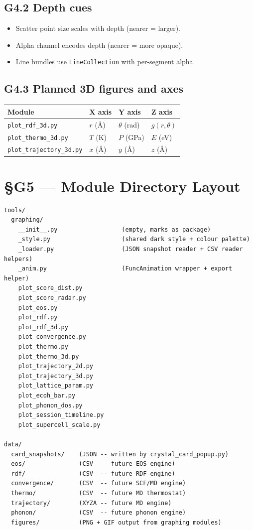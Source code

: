 \documentclass[11pt,a4paper]{article}
\begin{document}
\subsection{G4.2 Depth cues}
\begin{itemize}[leftmargin=2em]
  \item Scatter point size scales with depth (nearer = larger).
  \item Alpha channel encodes depth (nearer = more opaque).
  \item Line bundles use \texttt{LineCollection} with per-segment alpha.
\end{itemize}

\subsection{G4.3 Planned 3D figures and axes}

\begin{center}
\begin{tabular}{llll}
\toprule
Module & X axis & Y axis & Z axis \\
\midrule
\texttt{plot\_rdf\_3d.py}        & $r$ (\AA)  & $\theta$ (rad) & $g(r,\theta)$ \\
\texttt{plot\_thermo\_3d.py}     & $T$ (K)    & $P$ (GPa)      & $E$ (eV)      \\
\texttt{plot\_trajectory\_3d.py} & $x$ (\AA)  & $y$ (\AA)      & $z$ (\AA)     \\
\bottomrule
\end{tabular}
\end{center}

\section{\S{}G5 --- Module Directory Layout}

\begin{verbatim}
tools/
  graphing/
    __init__.py                  (empty, marks as package)
    _style.py                    (shared dark style + colour palette)
    _loader.py                   (JSON snapshot reader + CSV reader helpers)
    _anim.py                     (FuncAnimation wrapper + export helper)
    plot_score_dist.py
    plot_score_radar.py
    plot_eos.py
    plot_rdf.py
    plot_rdf_3d.py
    plot_convergence.py
    plot_thermo.py
    plot_thermo_3d.py
    plot_trajectory_2d.py
    plot_trajectory_3d.py
    plot_lattice_param.py
    plot_ecoh_bar.py
    plot_phonon_dos.py
    plot_session_timeline.py
    plot_supercell_scale.py

data/
  card_snapshots/    (JSON -- written by crystal_card_popup.py)
  eos/               (CSV  -- future EOS engine)
  rdf/               (CSV  -- future RDF engine)
  convergence/       (CSV  -- future SCF/MD engine)
  thermo/            (CSV  -- future MD thermostat)
  trajectory/        (XYZA -- future MD engine)
  phonon/            (CSV  -- future phonon engine)
  figures/           (PNG + GIF output from graphing modules)
\end{verbatim}
\end{document}

